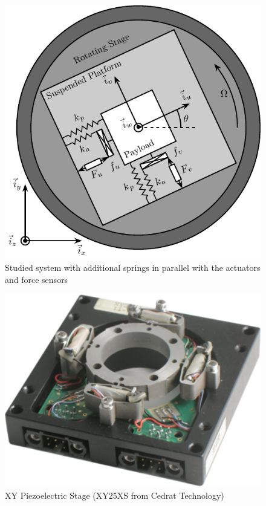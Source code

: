 \documentclass[10pt]{iopart}
\begin{document}
\begin{figure}[htbp]
\centering
\includegraphics[scale=0.9]{figs/fig12.pdf}
\caption{\label{fig:system_parallel_springs}Studied system with additional springs in parallel with the actuators and force sensors}
\end{figure}


\begin{figure}[htbp]
\centering
\includegraphics[scale=0.17]{figs/fig13.pdf}
\caption{\label{fig:cedrat_xy25xs}XY Piezoelectric Stage (XY25XS from Cedrat Technology)}
\end{figure}
\end{document}
